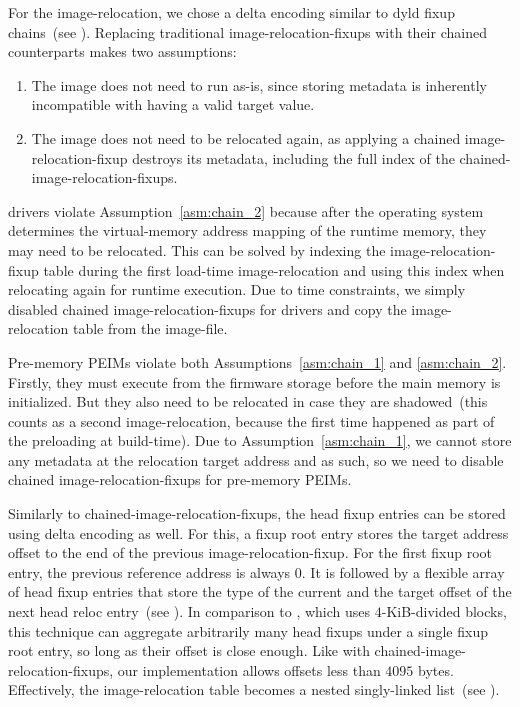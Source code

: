 For the \gls{image-relocation}, we chose a delta encoding similar to dyld fixup chains~(see ). Replacing traditional \glspl{image-relocation-fixup} with their chained counterparts makes two assumptions:
\begin{enumerate}
  \item The \gls{image} does not need to run as-is, since storing metadata is inherently incompatible with having a valid target value.\label{asm:chain_1}
  \item The \gls{image} does not need to be relocated again, as applying a chained \gls{image-relocation-fixup} destroys its metadata, including the full index of the \gls{chained-image-relocation-fixups}.\label{asm:chain_2}
\end{enumerate}
 drivers violate Assumption~\ref{asm:chain_2} because after the operating system determines the \gls{virtual-memory} address mapping of the  runtime memory, they may need to be relocated. This can be solved by indexing the \gls{image-relocation-fixup} table during the first load-time \gls{image-relocation} and using this index when relocating again for runtime execution. Due to time constraints, we simply disabled chained \glspl{image-relocation-fixup} for  drivers and copy the \gls{image-relocation} table from the \gls{image-file}.

Pre-memory \glspl{PEIM} violate both Assumptions~\ref{asm:chain_1} and \ref{asm:chain_2}. Firstly, they must execute from the \gls{firmware} storage before the main memory is initialized. But they also need to be relocated in case they are shadowed~(this counts as a second \gls{image-relocation}, because the first time happened as part of the preloading at build-time). Due to Assumption~\ref{asm:chain_1}, we cannot store any metadata at the relocation target address and as such, so we need to disable chained \glspl{image-relocation-fixup} for pre-memory \glspl{PEIM}.

Similarly to \gls{chained-image-relocation-fixups}, the head fixup entries can be stored using delta encoding as well. For this, a fixup root entry stores the target address offset to the end of the previous \gls{image-relocation-fixup}. For the first fixup root entry, the previous reference address is always $0$. It is followed by a flexible array of head fixup entries that store the type of the current and the target offset of the next head reloc entry~(see ). In comparison to , which uses $4$-KiB-divided blocks, this technique can aggregate arbitrarily many head fixups under a single fixup root entry, so long as their offset is close enough. Like with \gls{chained-image-relocation-fixups}, our implementation allows offsets less than $4095$ \glspl{byte}. Effectively, the \gls{image-relocation} table becomes a nested singly-linked list~(see ).

